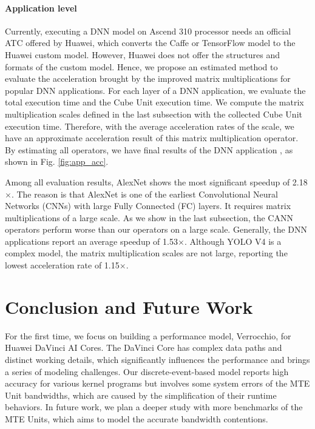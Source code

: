 \documentclass[12pt]{extbook}
\begin{document}
\paragraph{Application level}

Currently, executing a DNN model on Ascend 310 processor needs an official ATC offered by Huawei, which converts the Caffe or TensorFlow model to the Huawei custom model. However, Huawei does not offer the structures and formats of the custom model. Hence, we propose an estimated method to evaluate the acceleration brought by the improved matrix multiplications for popular DNN applications. For each layer of a DNN application, we evaluate the total execution time and the Cube Unit execution time. We compute the matrix multiplication scales defined in the last subsection with the collected Cube Unit execution time. Therefore, with the average acceleration rates of the scale, we have an approximate acceleration result of this matrix multiplication operator. By estimating all operators, we have final results of the DNN application \cite{DBLP:conf/cvpr/HeZRS16, DBLP:journals/corr/abs-2004-10934, DBLP:conf/cvpr/SandlerHZZC18, DBLP:conf/nips/KrizhevskySH12, DBLP:conf/naacl/DevlinCLT19}, as shown in Fig. \ref{fig:app_acc}.

Among all evaluation results, AlexNet shows the most significant speedup of 2.18$\times$. The reason is that AlexNet is one of the earliest Convolutional Neural Networks (CNNs) with large Fully Connected (FC) layers. It requires matrix multiplications of a large scale. As we show in the last subsection, the CANN operators perform worse than our operators on a large scale. Generally, the DNN applications report an average speedup of 1.53$\times$. Although YOLO V4 is a complex model, the matrix multiplication scales are not large, reporting the lowest acceleration rate of 1.15$\times$.

\section{Conclusion and Future Work}

For the first time, we focus on building a performance model, Verrocchio, for Huawei DaVinci AI Cores. The DaVinci Core has complex data paths and distinct working details, which significantly influences the performance and brings a series of modeling challenges. Our discrete-event-based model reports high accuracy for various kernel programs but involves some system errors of the MTE Unit bandwidths, which are caused by the simplification of their runtime behaviors. In future work, we plan a deeper study with more benchmarks of the MTE Units, which aims to model the accurate bandwidth contentions.
\end{document}
